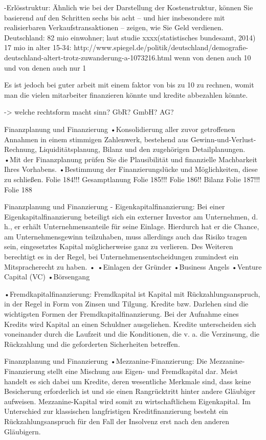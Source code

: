 -Erlösstruktur: Ähnlich wie bei der Darstellung der Kostenstruktur, können Sie basierend auf den Schritten sechs bis acht – und hier insbesondere mit realisierbaren Verkaufstransaktionen – zeigen, wie Sie Geld verdienen.
Deutschland: 82 mio einwohner; laut studie xxxx(statistisches bundesamt, 2014) 17 mio in alter 15-34:
http://www.spiegel.de/politik/deutschland/demografie-deutschland-altert-trotz-zuwanderung-a-1073216.html
wenn von denen auch 10%
und von denen auch nur 1%

Es ist jedoch bei guter arbeit mit einem faktor von bis zu 10 zu rechnen, womit man die vielen mitarbeiter finanzieren könnte und kredite abbezahlen könnte.

 -> welche rechtsform macht sinn? GbR? GmbH? AG?
 

Finanzplanung und Finanzierung
•Konsolidierung aller zuvor getroffenen Annahmen in einem stimmigen Zahlenwerk, bestehend aus Gewinn-und-Verlust-Rechnung, Liquiditätsplanung, Bilanz und den zugehörigen Detailplanungen.
•Mit der Finanzplanung prüfen Sie die Plausibilität und finanzielle Machbarkeit Ihres Vorhabens.
•Bestimmung der Finanzierungslücke und Möglichkeiten, diese zu schließen.
Folie 184!!! Gesamptlanung
Folie 185!!!
Folie 186!!
Bilanz Folie 187!!!
Folie 188


Finanzplanung und Finanzierung
- Eigenkapitalfinanzierung: Bei einer Eigenkapitalfinanzierung beteiligt sich ein externer Investor am Unternehmen, d. h., er erhält Unternehmensanteile für seine Einlage. Hierdurch hat er die Chance, am Unternehmensgewinn teilzuhaben, muss allerdings auch das Risiko tragen sein, eingesetztes Kapital möglicherweise ganz zu verlieren. Des Weiteren berechtigt es in der Regel, bei Unternehmensentscheidungen zumindest ein Mitspracherecht zu haben. •
•Einlagen der Gründer
•Business Angels
•Venture Capital (VC)
•Börsengang

•Fremdkapitalfinanzierung: Fremdkapital ist Kapital mit Rückzahlungsanspruch, in der Regel in Form von Zinsen und Tilgung. Kredite bzw. Darlehen sind die wichtigsten Formen der Fremdkapitalfinanzierung. Bei der Aufnahme eines Kredits wird Kapital an einen Schuldner ausgeliehen. Kredite unterscheiden sich voneinander durch die Laufzeit und die Konditionen, die v. a. die Verzinsung, die Rückzahlung und die geforderten Sicherheiten betreffen.


Finanzplanung und Finanzierung
•Mezzanine-Finanzierung: Die Mezzanine-Finanzierung stellt eine Mischung aus Eigen- und Fremdkapital dar. Meist handelt es sich dabei um Kredite, deren wesentliche Merkmale sind, dass keine Besicherung erforderlich ist und sie einen Rangrücktritt hinter andere Gläubiger aufweisen. Mezzanine-Kapital wird somit zu wirtschaftlichem Eigenkapital. Im Unterschied zur klassischen langfristigen Kreditfinanzierung besteht ein Rückzahlungsanspruch für den Fall der Insolvenz erst nach den anderen Gläubigern.


